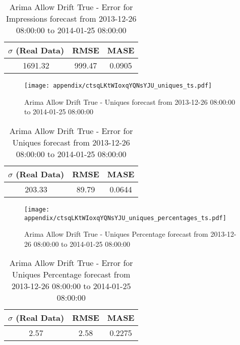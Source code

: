 \begin{table}[H]
\centering
\footnotesize
\begin{tabular}{ccc}
$\sigma$ (Real Data) & RMSE & MASE   \\ \hline
1691.32 & 999.47 & 0.0905 \\
\end{tabular}

\vspace{0.5cm}

\caption{
Arima Allow Drift True - Error for Impressions forecast from 2013-12-26 08:00:00 to 2014-01-25 08:00:00}
\end{table}

\begin{figure}[H] \begin{center} \leavevmode
\texttt{[image: appendix/ctsqLKtWIoxqYQNsYJU\_uniques\_ts.pdf]} \caption{
Arima Allow Drift True - Uniques forecast from 2013-12-26 08:00:00 to 2014-01-25 08:00:00} \label{fig:appendix/ctsqLKtWIoxqYQNsYJU_uniques_ts.pdf} \end{center}
\end{figure}

\begin{table}[H]
\centering
\footnotesize
\begin{tabular}{ccc}
$\sigma$ (Real Data) & RMSE & MASE   \\ \hline
203.33 & 89.79 & 0.0644 \\
\end{tabular}

\vspace{0.5cm}

\caption{
Arima Allow Drift True - Error for Uniques forecast from 2013-12-26 08:00:00 to 2014-01-25 08:00:00}
\end{table}

\begin{figure}[H] \begin{center} \leavevmode
\texttt{[image: appendix/ctsqLKtWIoxqYQNsYJU\_uniques\_percentages\_ts.pdf]} \caption{
Arima Allow Drift True - Uniques Percentage forecast from 2013-12-26 08:00:00 to 2014-01-25 08:00:00} \label{fig:appendix/ctsqLKtWIoxqYQNsYJU_uniques_percentages_ts.pdf} \end{center}
\end{figure}

\begin{table}[H]
\centering
\footnotesize
\begin{tabular}{ccc}
$\sigma$ (Real Data) & RMSE & MASE   \\ \hline
2.57 & 2.58 & 0.2275 \\
\end{tabular}

\vspace{0.5cm}

\caption{
Arima Allow Drift True - Error for Uniques Percentage forecast from 2013-12-26 08:00:00 to 2014-01-25 08:00:00}
\end{table}

